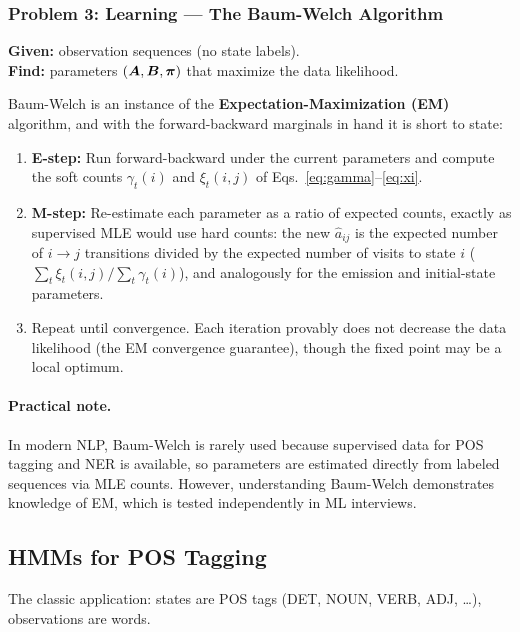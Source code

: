 \subsubsection{Problem 3: Learning --- The Baum-Welch Algorithm}

\textbf{Given:} observation sequences (no state labels).\\
\textbf{Find:} parameters $(\bm{A}, \bm{B}, \bm{\pi})$ that maximize the data
likelihood.

Baum-Welch is an instance of the \textbf{Expectation-Maximization (EM)}
algorithm, and with the forward-backward marginals in hand it is short to
state:
\begin{enumerate}
    \item \textbf{E-step:} Run forward-backward under the current parameters
    and compute the soft counts $\gamma_t(i)$ and $\xi_t(i,j)$ of
    Eqs.~\eqref{eq:gamma}--\eqref{eq:xi}.

    \item \textbf{M-step:} Re-estimate each parameter as a ratio of expected
    counts, exactly as supervised MLE would use hard counts: the new
    $\hat{a}_{ij}$ is the expected number of $i \to j$ transitions divided by
    the expected number of visits to state $i$
    ($\sum_t \xi_t(i,j) / \sum_t \gamma_t(i)$), and analogously for the
    emission and initial-state parameters.

    \item Repeat until convergence.  Each iteration provably does not decrease
    the data likelihood (the EM convergence guarantee), though the fixed point
    may be a local optimum.
\end{enumerate}

\paragraph{Practical note.}  In modern NLP, Baum-Welch is rarely used because
supervised data for POS tagging and NER is available, so parameters are
estimated directly from labeled sequences via MLE counts.  However,
understanding Baum-Welch demonstrates knowledge of EM, which is tested
independently in ML interviews.

\subsection{HMMs for POS Tagging}

The classic application: states are POS tags (DET, NOUN, VERB, ADJ, \ldots),
observations are words.

